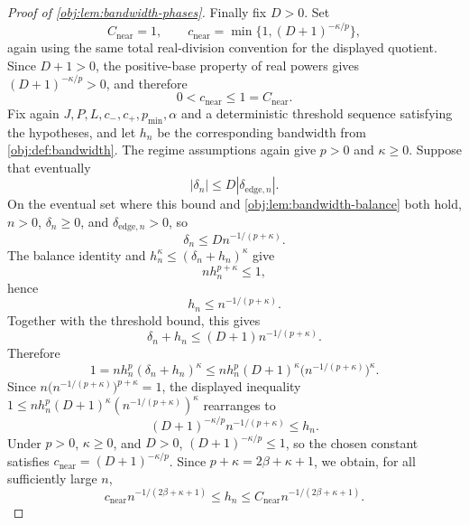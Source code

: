 \begin{proof}[Proof of \cref{obj:lem:bandwidth-phases}]
Finally fix \(D>0\). Set
\[
C_{\mathrm{near}}=1,
\qquad
c_{\mathrm{near}}=\min\{1,(D+1)^{-\kappa/p}\},
\]
again using the same total real-division convention for the displayed quotient. Since \(D+1>0\), the positive-base property of real powers gives \((D+1)^{-\kappa/p}>0\), and therefore
\[
0<c_{\mathrm{near}}\le1=C_{\mathrm{near}}.
\]
Fix again \(J,P,L,c_-,c_+,p_{\min},\alpha\) and a deterministic threshold sequence satisfying the hypotheses, and let \(h_n\) be the corresponding bandwidth from \cref{obj:def:bandwidth}. The regime assumptions again give \(p>0\) and \(\kappa\ge0\). Suppose that eventually
\[
|\delta_n|\le D|\delta_{\mathrm{edge},n}|.
\]
On the eventual set where this bound and \cref{obj:lem:bandwidth-balance} both hold, \(n>0\), \(\delta_n\ge0\), and \(\delta_{\mathrm{edge},n}>0\), so
\[
\delta_n\le D n^{-1/(p+\kappa)}.
\]
The balance identity and \(h_n^\kappa\le(\delta_n+h_n)^\kappa\) give
\[
n h_n^{p+\kappa}\le1,
\]
hence
\[
h_n\le n^{-1/(p+\kappa)}.
\]
Together with the threshold bound, this gives
\[
\delta_n+h_n\le(D+1)n^{-1/(p+\kappa)}.
\]
Therefore
\[
1
=
n h_n^p(\delta_n+h_n)^\kappa
\le
n h_n^p (D+1)^\kappa\bigl(n^{-1/(p+\kappa)}\bigr)^\kappa .
\]
Since \(n\bigl(n^{-1/(p+\kappa)}\bigr)^{p+\kappa}=1\), the displayed inequality \(1\le n h_n^p (D+1)^\kappa (n^{-1/(p+\kappa)})^\kappa\) rearranges to
\[
(D+1)^{-\kappa/p}n^{-1/(p+\kappa)}\le h_n .
\]
Under \(p>0\), \(\kappa\ge0\), and \(D>0\), \((D+1)^{-\kappa/p}\le1\), so the chosen constant satisfies \(c_{\mathrm{near}}=(D+1)^{-\kappa/p}\). Since \(p+\kappa=2\beta+\kappa+1\), we obtain, for all sufficiently large \(n\),
\[
c_{\mathrm{near}}n^{-1/(2\beta+\kappa+1)}
\le
h_n
\le
C_{\mathrm{near}}n^{-1/(2\beta+\kappa+1)} .
\]
\end{proof}
